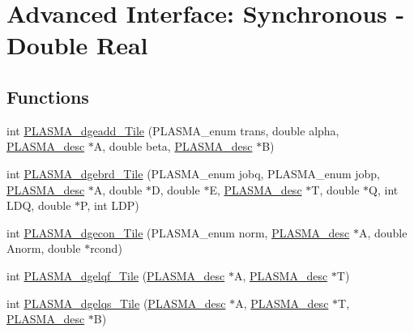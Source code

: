 \hypertarget{group__double__Tile}{}\section{Advanced Interface\+: Synchronous -\/ Double Real}
\label{group__double__Tile}
\subsection*{Functions}
\begin{DoxyCompactItemize}
\item 
int \hyperlink{group__double__Tile_gaa754e076d882761da52945daf75a90bb_gaa754e076d882761da52945daf75a90bb}{P\+L\+A\+S\+M\+A\+\_\+dgeadd\+\_\+\+Tile} (P\+L\+A\+S\+M\+A\+\_\+enum trans, double alpha, \hyperlink{structplasma__desc__t}{P\+L\+A\+S\+M\+A\+\_\+desc} $\ast$A, double beta, \hyperlink{structplasma__desc__t}{P\+L\+A\+S\+M\+A\+\_\+desc} $\ast$B)
\item 
int \hyperlink{group__double__Tile_gadb3bf023031b38e9004d0a32e43d541b_gadb3bf023031b38e9004d0a32e43d541b}{P\+L\+A\+S\+M\+A\+\_\+dgebrd\+\_\+\+Tile} (P\+L\+A\+S\+M\+A\+\_\+enum jobq, P\+L\+A\+S\+M\+A\+\_\+enum jobp, \hyperlink{structplasma__desc__t}{P\+L\+A\+S\+M\+A\+\_\+desc} $\ast$A, double $\ast$D, double $\ast$E, \hyperlink{structplasma__desc__t}{P\+L\+A\+S\+M\+A\+\_\+desc} $\ast$T, double $\ast$Q, int L\+D\+Q, double $\ast$P, int L\+D\+P)
\item 
int \hyperlink{group__double__Tile_gab8b49b21d2f82ff7e4eb1f4c6b16449b_gab8b49b21d2f82ff7e4eb1f4c6b16449b}{P\+L\+A\+S\+M\+A\+\_\+dgecon\+\_\+\+Tile} (P\+L\+A\+S\+M\+A\+\_\+enum norm, \hyperlink{structplasma__desc__t}{P\+L\+A\+S\+M\+A\+\_\+desc} $\ast$A, double Anorm, double $\ast$rcond)
\item 
int \hyperlink{group__double__Tile_ga0b1c31427237bbe97c4ecfd59332f7b4_ga0b1c31427237bbe97c4ecfd59332f7b4}{P\+L\+A\+S\+M\+A\+\_\+dgelqf\+\_\+\+Tile} (\hyperlink{structplasma__desc__t}{P\+L\+A\+S\+M\+A\+\_\+desc} $\ast$A, \hyperlink{structplasma__desc__t}{P\+L\+A\+S\+M\+A\+\_\+desc} $\ast$T)
\item 
int \hyperlink{group__double__Tile_gaafb4a585fe93fbf8c226e51200dffdc0_gaafb4a585fe93fbf8c226e51200dffdc0}{P\+L\+A\+S\+M\+A\+\_\+dgelqs\+\_\+\+Tile} (\hyperlink{structplasma__desc__t}{P\+L\+A\+S\+M\+A\+\_\+desc} $\ast$A, \hyperlink{structplasma__desc__t}{P\+L\+A\+S\+M\+A\+\_\+desc} $\ast$T, \hyperlink{structplasma__desc__t}{P\+L\+A\+S\+M\+A\+\_\+desc} $\ast$B)

\end{DoxyCompactItemize}
